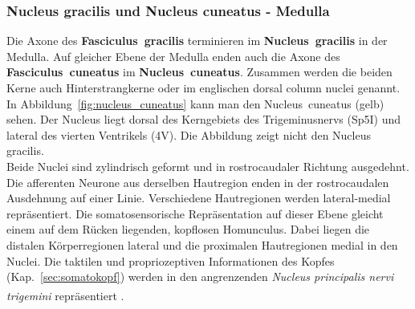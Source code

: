 \documentclass[12pt,a4paper,pdftex]{article}
\begin{document}
\subsubsection*{Nucleus gracilis und Nucleus cuneatus - Medulla}

Die Axone des \textbf{Fasciculus~gracilis} terminieren im \textbf{Nucleus~gracilis}  in der Medulla. Auf gleicher Ebene der Medulla enden auch die Axone des \textbf{Fasciculus~cuneatus} im \textbf{Nucleus~cuneatus}. Zusammen werden die beiden Kerne auch Hinterstrangkerne oder im englischen dorsal column nuclei genannt. In Abbildung~\ref{fig:nucleus_cuneatus} kann man den Nucleus~cuneatus (gelb) sehen. Der Nucleus liegt dorsal des Kerngebiets des Trigeminusnervs (Sp5I) und lateral des vierten Ventrikels (4V). Die Abbildung zeigt nicht den Nucleus gracilis.
\\
\noindent
Beide Nuclei sind zylindrisch geformt und in rostrocaudaler Richtung ausgedehnt. Die afferenten Neurone aus derselben Hautregion enden in der rostrocaudalen Ausdehnung auf einer Linie. Verschiedene Hautregionen werden lateral-medial repräsentiert. Die somatosensorische Repräsentation auf dieser Ebene gleicht einem auf dem Rücken liegenden, kopflosen Homunculus. Dabei liegen die distalen Körperregionen lateral und die proximalen Hautregionen medial in den Nuclei. Die taktilen und propriozeptiven Informationen des Kopfes (Kap.~\ref{sec:somatokopf}) werden in den angrenzenden \textit{Nucleus principalis nervi trigemini}  repräsentiert \textsuperscript{\cite[22]{kandel2013principles}}. 
\end{document}
